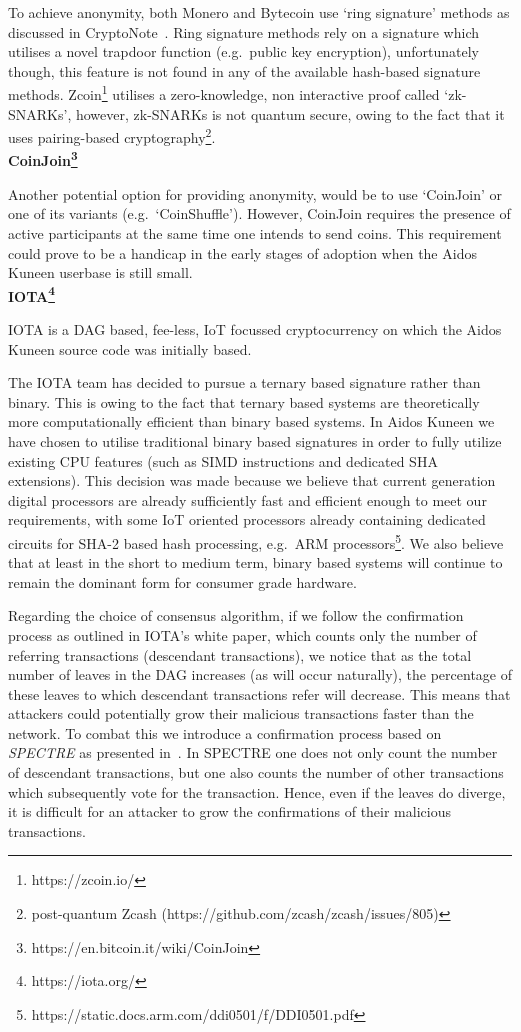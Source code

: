 \documentclass[a4paper,10pt,twocolumn]{article}
\begin{document}
To achieve anonymity, both Monero and Bytecoin use `ring signature' methods as discussed in CryptoNote~\cite{ringsig}. Ring signature 
methods rely on a signature which utilises a novel trapdoor function (e.g.\ public key encryption), unfortunately though, this feature is 
not found in any of the available hash-based signature methods. Zcoin\footnote{https://zcoin.io/} utilises a zero-knowledge, non interactive proof called `zk-SNARKs', however, zk-SNARKs is not quantum secure, owing to the fact that it uses pairing-based 
cryptography\footnote{post-quantum Zcash (https://github.com/zcash/zcash/issues/805)}. 
\\

\noindent
{\bf CoinJoin\footnote{https://en.bitcoin.it/wiki/CoinJoin}}

Another potential option for providing anonymity, would be to use `CoinJoin' or one of its variants (e.g.\ `CoinShuffle'). However, 
CoinJoin requires the presence of active participants at the same time one intends to send coins. This requirement could prove to be a 
handicap in the early stages of adoption when the Aidos Kuneen userbase is still small. 
\\

\noindent
{\bf IOTA\footnote{https://iota.org/}}

IOTA is a DAG based, fee-less, IoT focussed cryptocurrency on which the Aidos Kuneen source code was initially based. 

The IOTA team has decided to pursue a ternary based signature rather than binary. This is owing to the fact that ternary based 
systems are theoretically more computationally efficient than binary based systems. In Aidos Kuneen we have chosen to utilise 
traditional binary based signatures in order to fully utilize existing CPU features (such as SIMD instructions and dedicated SHA 
extensions). This decision was made because we believe that current generation digital processors are already sufficiently fast and 
efficient enough to meet our requirements, with some IoT oriented processors already containing dedicated circuits for 
SHA-2 based hash processing, e.g.~ARM processors\footnote{https://static.docs.arm.com/ddi0501/f/DDI0501.pdf}. We also believe that at 
least in the short to medium term, binary based systems will continue to remain the dominant form for consumer grade hardware.

Regarding the choice of consensus algorithm, if we follow the confirmation process as outlined in IOTA's white paper, which counts only the number of referring transactions 
(descendant transactions), we notice that as the total number of leaves in the DAG increases (as will occur naturally), 
the percentage of these leaves to which descendant transactions refer will decrease.
This means that attackers could potentially grow their malicious
transactions faster than the network. To combat this we introduce a confirmation process based on \emph{SPECTRE} as presented 
in~\cite{spectre}. In SPECTRE one does not only count the number of descendant transactions, but one also counts the number of other 
transactions which subsequently vote for the transaction. Hence, even if the leaves do diverge, it is difficult for an attacker to grow 
the confirmations of their malicious transactions.
\end{document}
